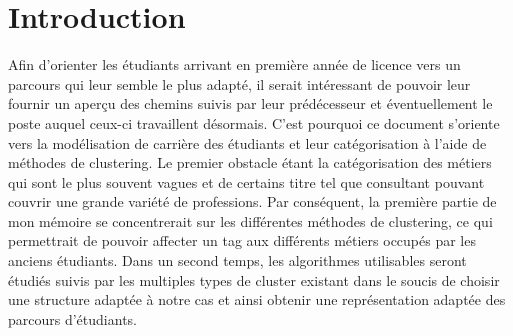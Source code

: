 \documentclass[memoire.tex]{subfiles}
\begin{document}
\newpage
\chapter*{Introduction}
Afin d'orienter les étudiants arrivant en première année de licence vers un parcours qui leur semble le plus adapté, il serait intéressant de pouvoir leur fournir un
aperçu des chemins suivis par leur prédécesseur et éventuellement le poste auquel
ceux-ci travaillent désormais. C'est pourquoi ce document s'oriente vers la modélisation de carrière des étudiants et leur catégorisation à l'aide de méthodes
de clustering. Le premier obstacle étant la catégorisation des métiers qui sont le plus
souvent vagues et de certains titre tel que consultant pouvant couvrir une grande
variété de professions. Par conséquent, la première partie de mon mémoire se concentrerait sur les différentes méthodes de clustering, ce qui permettrait de pouvoir affecter un tag aux différents métiers occupés par les anciens étudiants. Dans un second temps, les algorithmes utilisables seront étudiés suivis par les multiples types de cluster existant dans le soucis de choisir une structure adaptée à notre cas et ainsi obtenir une représentation adaptée des parcours d'étudiants.
\end{document}
